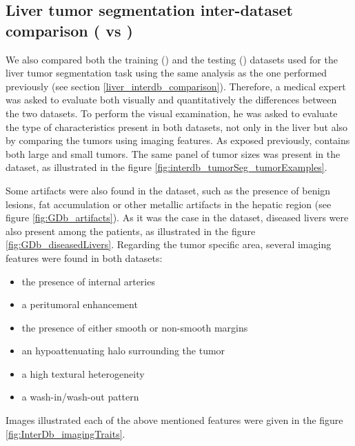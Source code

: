 \subsection{Liver tumor segmentation inter-dataset comparison (\textbf{} vs \textbf{})} \label{liver_tumor_interdb_comparison}


We also compared both the training (\textbf{}) and the testing (\textbf{}) datasets used for the liver tumor segmentation task using the same analysis as the one performed previously (see section \ref{liver_interdb_comparison}).
Therefore, a medical expert was asked to evaluate both visually and quantitatively the differences between the two datasets.
To perform the visual examination, he was asked to evaluate the type of characteristics present in both datasets, not only in the liver but also by comparing the tumors using imaging features. 
As exposed previously, \textbf{} contains both large and small tumors. The same panel of tumor sizes was present in the \textbf{} dataset, as illustrated in the figure \ref{fig:interdb_tumorSeg_tumorExamples}.

Some artifacts were also found in the \textbf{} dataset, such as the presence of benign lesions, fat accumulation or other metallic artifacts in the hepatic region (see figure \ref{fig:GDb_artifacts}).
As it was the case in the \textbf{} dataset, diseased livers were also present among the \textbf{} patients, as illustrated in the figure \ref{fig:GDb_diseasedLivers}.
Regarding the tumor specific area, several imaging features were found in both datasets:
\begin{itemize}
\item the presence of internal arteries
\item a peritumoral enhancement
\item the presence of either smooth or non-smooth margins
\item an hypoattenuating halo surrounding the tumor
\item a high textural heterogeneity
\item a wash-in/wash-out pattern 
\end{itemize}
Images illustrated each of the above mentioned features were given in the figure \ref{fig:InterDb_imagingTraits}.


